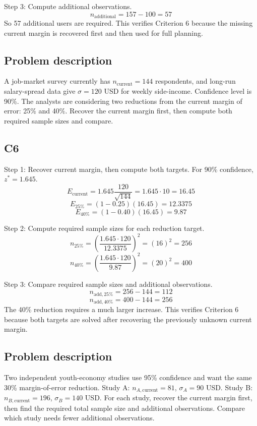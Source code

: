 \begin{ExamProblems}
		Step 3: Compute additional observations.
		\[
		n_{\text{additional}} = 157 - 100 = 57
		\]
		So 57 additional users are required. This verifies Criterion 6 because the missing current margin is recovered first and then used for full planning.

		\item
		\subsection*{Problem description}
		A job-market survey currently has $n_{\text{current}} = 144$ respondents, and long-run salary-spread data give $\sigma = 120$ USD for weekly side-income. Confidence level is 90\%. The analysts are considering two reductions from the current margin of error: 25\% and 40\%. Recover the current margin first, then compute both required sample sizes and compare.

		\subsection*{C6}
		Step 1: Recover current margin, then compute both targets. For 90\% confidence, $z^* = 1.645$.
		\[
		E_{\text{current}} = 1.645\frac{120}{\sqrt{144}}
		= 1.645\cdot 10
		= 16.45
		\]
		\[
		E_{25\%} = (1-0.25)(16.45) = 12.3375
		\]
		\[
		E_{40\%} = (1-0.40)(16.45) = 9.87
		\]

		Step 2: Compute required sample sizes for each reduction target.
		\[
		n_{25\%} = \left(\frac{1.645\cdot 120}{12.3375}\right)^2
		= \left(16\right)^2
		= 256
		\]
		\[
		n_{40\%} = \left(\frac{1.645\cdot 120}{9.87}\right)^2
		= \left(20\right)^2
		= 400
		\]

		Step 3: Compare required sample sizes and additional observations.
		\[
		n_{\text{add},25\%} = 256 - 144 = 112
		\]
		\[
		n_{\text{add},40\%} = 400 - 144 = 256
		\]
		The 40\% reduction requires a much larger increase. This verifies Criterion 6 because both targets are solved after recovering the previously unknown current margin.

		\item
		\subsection*{Problem description}
		Two independent youth-economy studies use 95\% confidence and want the same 30\% margin-of-error reduction.
		Study A: $n_{A,\text{current}} = 81$, $\sigma_A = 90$ USD.
		Study B: $n_{B,\text{current}} = 196$, $\sigma_B = 140$ USD.
		For each study, recover the current margin first, then find the required total sample size and additional observations. Compare which study needs fewer additional observations.


\end{ExamProblems}
